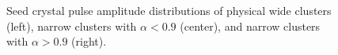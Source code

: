 \begin{figure}[htbp]
  \centering
  \caption{
    Seed crystal pulse amplitude distributions of physical wide clusters (left), narrow clusters with $\alpha < 0.9$ (center), and narrow clusters with $\alpha > 0.9$ (right).
  }
  \label{fig:spike_amplitudes}
\end{figure}

